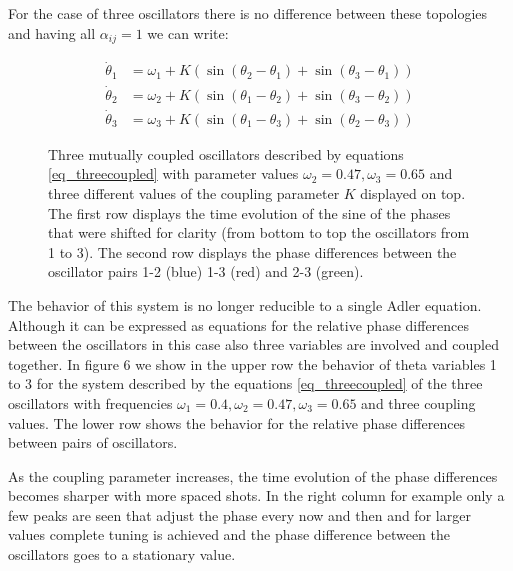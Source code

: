 \documentclass{article}
\begin{document}
For the case of three oscillators there is no difference between these topologies and having all $\alpha_{ij}=1$ we can write:

\begin{subequations} \label{eq_threecoupled}
\begin{align}
    \dot{\theta}_1 &= \omega_1 + K \left(\sin(\theta_2 - \theta_1)+\sin(\theta_3 - \theta_1)\right) \\
    \dot{\theta}_2 &= \omega_2 + K \left(\sin(\theta_1 - \theta_2)+\sin(\theta_3 - \theta_2)\right) \\
    \dot{\theta}_3 &= \omega_3 + K \left(\sin(\theta_1 - \theta_3)+\sin(\theta_2 - \theta_3)\right) 
\end{align}
\end{subequations}




\begin{figure} [h]
    \centerline{}
    \caption{Three mutually coupled oscillators described by equations \ref{eq_threecoupled} with parameter values $\omega_2=0.47,\omega_3=0.65$ and three different values of the coupling parameter $K$ displayed on top. The first row displays the time evolution of the sine of the phases that were shifted for clarity (from bottom to top the oscillators from 1 to 3). The second row displays the phase differences between the oscillator pairs 1-2 (blue) 1-3 (red) and 2-3 (green).}
    \label{fig_threecoupled}
\end{figure}

The behavior of this system is no longer reducible to a single Adler equation. 
Although it can be expressed as equations for the relative phase differences between the oscillators in this case also three variables are involved and coupled together. 
In figure 6 we show in the upper row the behavior of theta variables 1 to 3 for the system described by the equations \ref{eq_threecoupled} of the three oscillators with frequencies $\omega_1=0.4,\omega_2=0.47,\omega_3=0.65$ and three coupling values. 
The lower row shows the behavior for the relative phase differences between pairs of oscillators.

As the coupling parameter increases, the time evolution of the phase differences becomes sharper with more spaced shots. 
In the right column for example only a few peaks are seen that adjust the phase every now and then and for larger values complete tuning is achieved and the phase difference between the oscillators goes to a stationary value.
\end{document}
